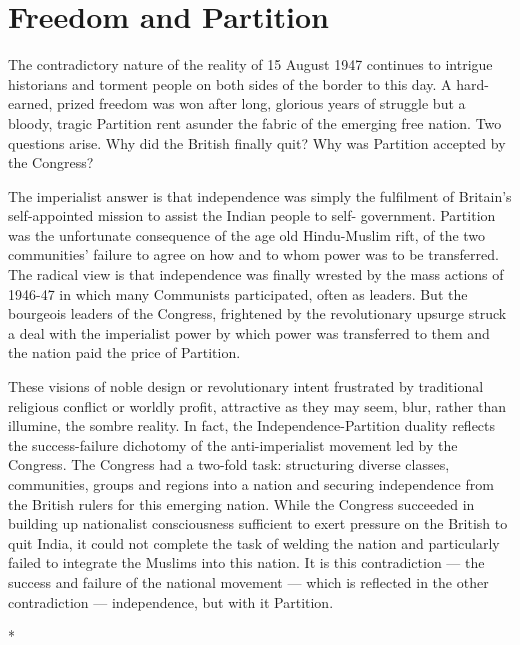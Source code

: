 
\chapter{Freedom and Partition}



The contradictory nature of the reality of 15 August 1947 continues to intrigue historians and torment people on both sides of the border to this day. A hard-earned, prized freedom was won after long, glorious years of struggle but a bloody, tragic Partition rent asunder the fabric of the emerging free nation. Two questions arise. Why did the British finally quit? Why was Partition accepted by the Congress? 

The imperialist answer is that independence was simply the fulfilment of Britain's self-appointed mission to assist the Indian people to self- government. Partition was the unfortunate consequence of the age old Hindu-Muslim rift, of the two communities' failure to agree on how and to whom power was to be transferred. The radical view is that independence was finally wrested by the mass actions of 1946-47 in which many Communists participated, often as leaders. But the bourgeois leaders of the Congress, frightened by the revolutionary upsurge struck a deal with the imperialist power by which power was transferred to them and the nation paid the price of Partition. 

These visions of noble design or revolutionary intent frustrated by traditional religious conflict or worldly profit, attractive as they may seem, blur, rather than illumine, the sombre reality. In fact, the Independence-Partition duality reflects the success-failure dichotomy of the anti-imperialist movement led by the Congress. The Congress had a two-fold task: structuring diverse classes, communities, groups and regions into a nation and securing independence from the British rulers for this emerging nation. While the Congress succeeded in building up nationalist consciousness sufficient to exert pressure on the British to quit India, it could not complete the task of welding the nation and particularly failed to integrate the Muslims into this nation. It is this contradiction — the success and failure of the national movement — which is reflected in the other contradiction — independence, but with it Partition.

\begin{center}*\end{center}

\paragraph*{}


